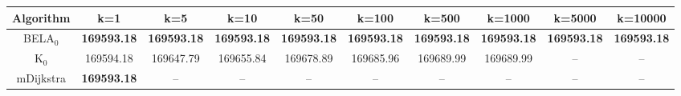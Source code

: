 \begin{tabular}{c|ccccccccc}\toprule
Algorithm & k=1 & k=5 & k=10 & k=50 & k=100 & k=500 & k=1000 & k=5000 & k=10000 \\ \midrule
BELA$_0$ & \textbf{169593.18} & \textbf{169593.18} & \textbf{169593.18} & \textbf{169593.18} & \textbf{169593.18} & \textbf{169593.18} & \textbf{169593.18} & \textbf{169593.18} & \textbf{169593.18} \\
K$_0$ & 169594.18 & 169647.79 & 169655.84 & 169678.89 & 169685.96 & 169689.99 & 169689.99 & -- & -- \\
mDijkstra & \textbf{169593.18} & -- & -- & -- & -- & -- & -- & -- & -- \\ \bottomrule 
\end{tabular}
